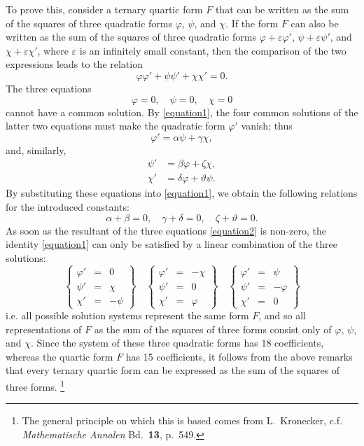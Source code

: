 \documentclass{article}
\newcommand{\oldpage}[1]{\marginpar{\footnotesize$\Big\vert$ \textit{p.~#1}}}
\begin{document}
To prove this, consider a ternary quartic form $F$ that can be written as the sum of the squares of three quadratic forms $\varphi$, $\psi$, and $\chi$.
If the form $F$ can also be written as the sum of the squares of three quadratic forms $\varphi+\varepsilon\varphi'$, $\psi+\varepsilon\psi'$, and $\chi+\varepsilon\chi'$, where $\varepsilon$ is an infinitely small constant, then the comparison of the two expressions leads to the relation
\[
\label{equation1}
  \varphi\varphi' + \psi\psi' + \chi\chi' = 0.
  \tag{1}
\]
The three equations
\[
\label{equation2}
  \varphi=0,
  \quad\psi=0,
  \quad\chi=0
  \tag{2}
\]
cannot have a common solution.
By \cref{equation1}, the four common solutions of the latter two equations must make
\oldpage{343}
the quadratic form $\varphi'$ vanish;
thus
\[
  \varphi' = \alpha\psi+\gamma\chi,
\]
and, similarly,
\begin{align*}
  \psi' &= \beta\varphi+\zeta\chi,
\\\chi' &= \delta\varphi+\vartheta\psi.
\end{align*}
By substituting these equations into \cref{equation1}, we obtain the following relations for the introduced constants:
\[
  \alpha+\beta = 0,
  \quad\gamma+\delta = 0,
  \quad\zeta+\vartheta = 0.
\]
As soon as the resultant of the three equations \cref{equation2} is non-zero, the identity \cref{equation1} can only be satisfied by a linear combination of the three solutions:
\[
  \left\{
    \begin{array}{rcr}
      \varphi' &= &0
    \\\psi' &= &\chi
    \\\chi' &= &-\psi
    \end{array}
  \right\}
  \quad
  \left\{
    \begin{array}{rcr}
      \varphi' &= &-\chi
    \\\psi' &= &0
    \\\chi' &= &\varphi
    \end{array}
  \right\}
  \quad
  \left\{
    \begin{array}{rcr}
      \varphi' &= &\psi
    \\\psi' &= &-\varphi
    \\\chi' &= &0
    \end{array}
  \right\}
\]
i.e. all possible solution systems represent the same form $F$, and so all representations of $F$ as the sum of the squares of three forms consist only of $\varphi$, $\psi$, and $\chi$.
Since the system of these three quadratic forms has 18 coefficients, whereas the quartic form $F$ has 15 coefficients, it follows from the above remarks that every ternary quartic form can be expressed as the sum of the squares of three forms.
\footnote{The general principle on which this is based comes from L.~Kronecker, c.f. \emph{Mathematische Annalen} Bd.~\textbf{13}, p.~549.}
\end{document}
